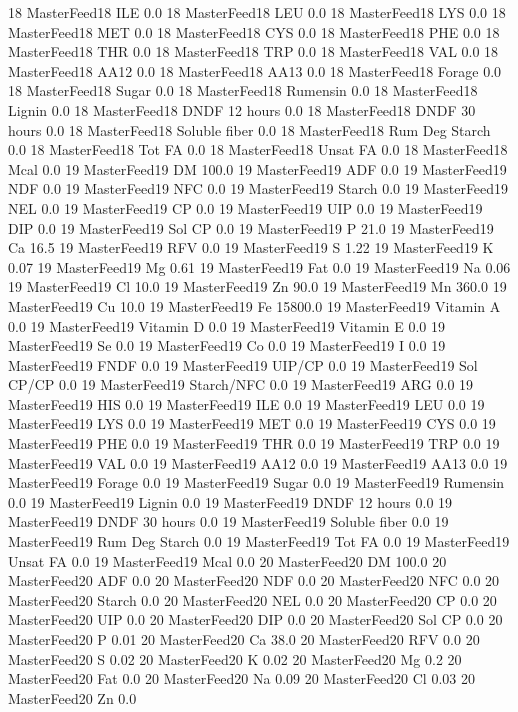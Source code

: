 \documentclass[letterpaper,10pt,english]{sphinxmanual}
\begin{document}
\begin{sphinxVerbatim}[commandchars=\\\{\},numbers=left,firstnumber=1,stepnumber=1]
18 MasterFeed18 ILE 0.0
18 MasterFeed18 LEU 0.0
18 MasterFeed18 LYS 0.0
18 MasterFeed18 MET 0.0
18 MasterFeed18 CYS 0.0
18 MasterFeed18 PHE 0.0
18 MasterFeed18 THR 0.0
18 MasterFeed18 TRP 0.0
18 MasterFeed18 VAL 0.0
18 MasterFeed18 AA\PYGZsh{}12 0.0
18 MasterFeed18 AA\PYGZsh{}13 0.0
18 MasterFeed18 \PYGZpc{} Forage 0.0
18 MasterFeed18 Sugar \PYGZpc{} 0.0
18 MasterFeed18 Rumensin 0.0
18 MasterFeed18 Lignin 0.0
18 MasterFeed18 DNDF 12 hours 0.0
18 MasterFeed18 DNDF 30 hours 0.0
18 MasterFeed18 Soluble fiber 0.0
18 MasterFeed18 Rum Deg Starch 0.0
18 MasterFeed18 Tot FA 0.0
18 MasterFeed18 Unsat FA 0.0
18 MasterFeed18 Mcal 0.0
19 MasterFeed19 DM 100.0
19 MasterFeed19 ADF 0.0
19 MasterFeed19 NDF 0.0
19 MasterFeed19 NFC 0.0
19 MasterFeed19 Starch 0.0
19 MasterFeed19 NEL 0.0
19 MasterFeed19 CP 0.0
19 MasterFeed19 UIP 0.0
19 MasterFeed19 DIP 0.0
19 MasterFeed19 Sol CP 0.0
19 MasterFeed19 P 21.0
19 MasterFeed19 Ca 16.5
19 MasterFeed19 RFV 0.0
19 MasterFeed19 S 1.22
19 MasterFeed19 K 0.07
19 MasterFeed19 Mg 0.61
19 MasterFeed19 Fat 0.0
19 MasterFeed19 Na 0.06
19 MasterFeed19 Cl 10.0
19 MasterFeed19 Zn 90.0
19 MasterFeed19 Mn 360.0
19 MasterFeed19 Cu 10.0
19 MasterFeed19 Fe 15800.0
19 MasterFeed19 Vitamin A 0.0
19 MasterFeed19 Vitamin D 0.0
19 MasterFeed19 Vitamin E 0.0
19 MasterFeed19 Se 0.0
19 MasterFeed19 Co 0.0
19 MasterFeed19 I 0.0
19 MasterFeed19 FNDF 0.0
19 MasterFeed19 UIP/CP 0.0
19 MasterFeed19 Sol CP/CP 0.0
19 MasterFeed19 Starch/NFC 0.0
19 MasterFeed19 ARG 0.0
19 MasterFeed19 HIS 0.0
19 MasterFeed19 ILE 0.0
19 MasterFeed19 LEU 0.0
19 MasterFeed19 LYS 0.0
19 MasterFeed19 MET 0.0
19 MasterFeed19 CYS 0.0
19 MasterFeed19 PHE 0.0
19 MasterFeed19 THR 0.0
19 MasterFeed19 TRP 0.0
19 MasterFeed19 VAL 0.0
19 MasterFeed19 AA\PYGZsh{}12 0.0
19 MasterFeed19 AA\PYGZsh{}13 0.0
19 MasterFeed19 \PYGZpc{} Forage 0.0
19 MasterFeed19 Sugar \PYGZpc{} 0.0
19 MasterFeed19 Rumensin 0.0
19 MasterFeed19 Lignin 0.0
19 MasterFeed19 DNDF 12 hours 0.0
19 MasterFeed19 DNDF 30 hours 0.0
19 MasterFeed19 Soluble fiber 0.0
19 MasterFeed19 Rum Deg Starch 0.0
19 MasterFeed19 Tot FA 0.0
19 MasterFeed19 Unsat FA 0.0
19 MasterFeed19 Mcal 0.0
20 MasterFeed20 DM 100.0
20 MasterFeed20 ADF 0.0
20 MasterFeed20 NDF 0.0
20 MasterFeed20 NFC 0.0
20 MasterFeed20 Starch 0.0
20 MasterFeed20 NEL 0.0
20 MasterFeed20 CP 0.0
20 MasterFeed20 UIP 0.0
20 MasterFeed20 DIP 0.0
20 MasterFeed20 Sol CP 0.0
20 MasterFeed20 P 0.01
20 MasterFeed20 Ca 38.0
20 MasterFeed20 RFV 0.0
20 MasterFeed20 S 0.02
20 MasterFeed20 K 0.02
20 MasterFeed20 Mg 0.2
20 MasterFeed20 Fat 0.0
20 MasterFeed20 Na 0.09
20 MasterFeed20 Cl 0.03
20 MasterFeed20 Zn 0.0

\end{sphinxVerbatim}
\end{document}

